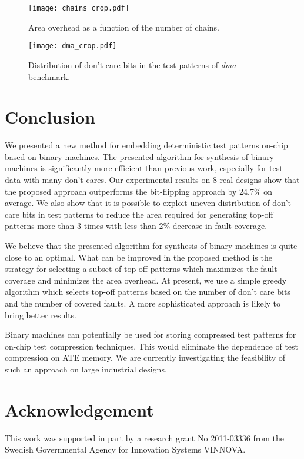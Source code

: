 \documentclass[10pt,conference]{IEEEtran}
\begin{document}
\begin{figure}[t!]
\begin{center}
    \texttt{[image: chains\_crop.pdf]}
\caption{Area overhead as a function of the number of chains.}\label{fs}
\end{center}
\end{figure}


\begin{figure}[t!]
\begin{center}
    \texttt{[image: dma\_crop.pdf]}
\caption{Distribution of don't care bits in the test patterns of {\em dma} benchmark.}\label{dma}
\end{center}
\end{figure}






\section{Conclusion} \label{con}

We presented a new method for embedding deterministic test patterns on-chip
based on binary machines. The
presented algorithm for synthesis of binary machines is significantly 
more efficient than previous work, especially for test data with many
don't cares. 
Our experimental results on 8 real designs show that the proposed
approach outperforms the bit-flipping approach by 24.7\% on average.
We also show that it is possible to exploit uneven distribution of 
don't care bits in test patterns to reduce the area required for 
generating top-off patterns more than 3 times with less than 2\% 
decrease in fault coverage.

We believe that the presented algorithm for synthesis of binary machines
is quite close to an optimal. What can be improved in the proposed method 
is the strategy for selecting a subset of top-off patterns which
maximizes the fault coverage and minimizes the area overhead.
At present, we use a simple greedy algorithm which selects top-off patterns based on 
the number of don't care bits and the number of covered faults.
A more sophisticated approach is likely to bring better results.

Binary machines can potentially be used for storing
compressed test patterns for on-chip test compression techniques. 
This would eliminate the dependence of test compression 
on ATE memory. We are currently investigating the feasibility of
such an approach on large industrial designs.

\section{Acknowledgement} \label{ack}

This work was supported in part by a research grant No 2011-03336 from the Swedish Governmental Agency for Innovation Systems VINNOVA.



\end{document}
